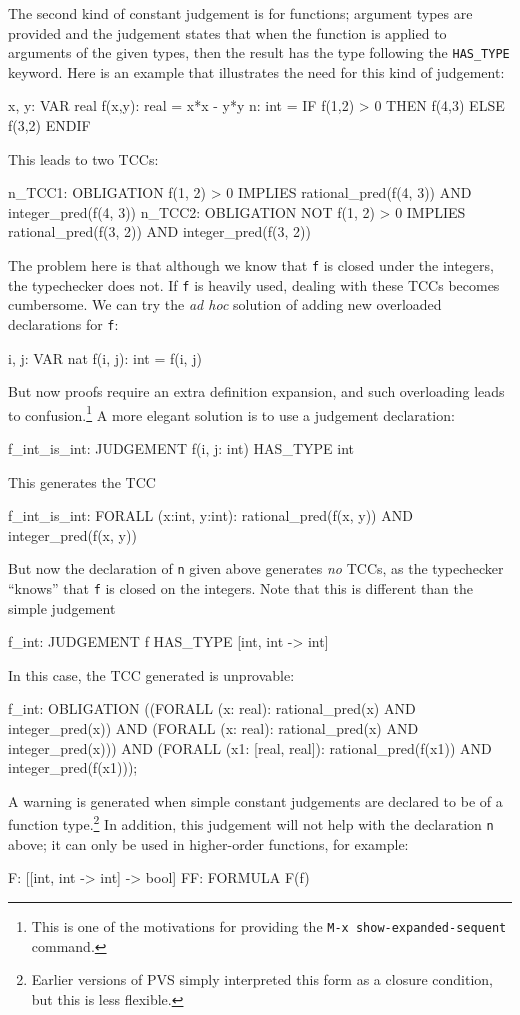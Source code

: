 The second kind of constant judgement is for functions; argument types are
provided and the judgement states that when the function is applied to
arguments of the given types, then the result has the type following the
\texttt{HAS\_TYPE} keyword.  Here is an example that illustrates the need
for this kind of judgement:
\begin{pvsex}
  x, y: VAR real
  f(x,y): real = x*x - y*y
  n: int = IF f(1,2) > 0 THEN f(4,3) ELSE f(3,2) ENDIF
\end{pvsex}
This leads to two TCCs:
\begin{pvsex}
  n_TCC1: OBLIGATION
    f(1, 2) > 0 IMPLIES
      rational_pred(f(4, 3)) AND integer_pred(f(4, 3))
  n_TCC2: OBLIGATION
    NOT f(1, 2) > 0 IMPLIES
      rational_pred(f(3, 2)) AND integer_pred(f(3, 2))
\end{pvsex}
The problem here is that although we know that \texttt{f} is closed under
the integers, the typechecker does not.  If \texttt{f} is heavily used,
dealing with these TCCs becomes cumbersome.  We can try the \emph{ad hoc}
solution of adding new overloaded declarations for \texttt{f}:
\begin{pvsex}
  i, j: VAR nat
  f(i, j): int = f(i, j)
\end{pvsex}
But now proofs require an extra definition expansion, and such overloading
leads to confusion.\footnote{This is one of the motivations for providing
the \texttt{M-x~show-expanded-sequent} command.}  A more elegant solution
is to use a judgement declaration:
\begin{pvsex}
  f_int_is_int: JUDGEMENT f(i, j: int) HAS\_TYPE int
\end{pvsex}
This generates the TCC
\begin{pvsex}
  f_int_is_int: FORALL (x:int, y:int):
                  rational_pred(f(x, y)) AND integer_pred(f(x, y))
\end{pvsex}
But now the declaration of \texttt{n} given above generates \emph{no}
TCCs, as the typechecker ``knows'' that \texttt{f} is closed on the
integers.  Note that this is different than the simple judgement
\begin{pvsex}
  f_int: JUDGEMENT f HAS\_TYPE [int, int -> int]
\end{pvsex}
In this case, the TCC generated is unprovable:
\begin{pvsex}
  f_int: OBLIGATION
    ((FORALL (x: real): rational_pred(x) AND integer_pred(x)) AND
      (FORALL (x: real): rational_pred(x) AND integer_pred(x)))
     AND
     (FORALL (x1: [real, real]):
        rational_pred(f(x1)) AND integer_pred(f(x1)));
\end{pvsex}
A warning is generated when simple constant judgements are declared to be
of a function type.\footnote{Earlier versions of PVS simply interpreted
this form as a closure condition, but this is less flexible.}  In
addition, this judgement will not help with the declaration \texttt{n}
above; it can only be used in higher-order functions, for example:
\begin{pvsex}
  F: [[int, int -> int] -> bool]
  FF: FORMULA F(f)
\end{pvsex}

